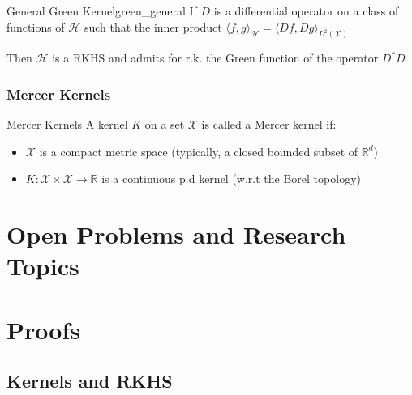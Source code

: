 \documentclass[10pt]{article}
\begin{document}
\begin{Theorem}{General Green Kernel}{green_general}
  If $D$ is a differential operator on a class of functions of $\mathcal{H}$
  such that the inner product $\langle f, g \rangle_\mathcal{H} = \langle Df, Dg 
  \rangle_{L^2(\mathcal{X})}$

  Then $\mathcal{H}$ is a RKHS and admits for r.k. the Green function of the 
  operator $D^*D$
\end{Theorem}


\subsubsection{Mercer Kernels}

\begin{Definition}{Mercer Kernels}{}
  A kernel $K$ on a set $\mathcal{X}$ is called a Mercer kernel if: 
  \begin{itemize}
    \item $\mathcal{X}$ is a compact metric space (typically, a closed bounded
    subset of $\mathbb{R}^d$)
    \item $K: \mathcal{X}\times\mathcal{X} \rightarrow \mathbb{R}$ is a
    continuous p.d kernel (w.r.t the Borel topology)
  \end{itemize}
\end{Definition}

\section{Open Problems and Research Topics}



\appendix

\section{Proofs}

\subsection{Kernels and RKHS}
\end{document}
